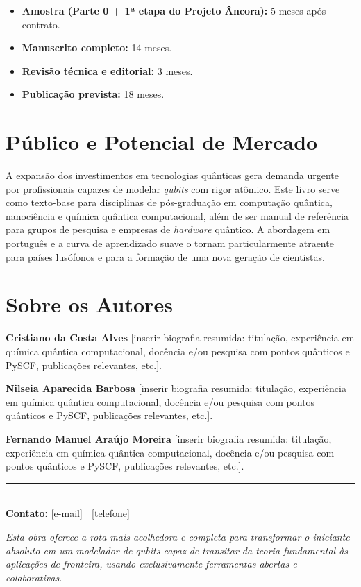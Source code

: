 \documentclass[12pt,a4paper]{article}
\begin{document}
	\begin{itemize}
		\item \textbf{Amostra (Parte 0 + 1ª etapa do Projeto Âncora):} 5 meses após contrato.
		\item \textbf{Manuscrito completo:} 14 meses.
		\item \textbf{Revisão técnica e editorial:} 3 meses.
		\item \textbf{Publicação prevista:} 18 meses.
	\end{itemize}
	
	\section{Público e Potencial de Mercado}
	
	A expansão dos investimentos em tecnologias quânticas gera demanda urgente por profissionais capazes de modelar \emph{qubits} com rigor atômico. Este livro serve como texto-base para disciplinas de pós-graduação em computação quântica, nanociência e química quântica computacional, além de ser manual de referência para grupos de pesquisa e empresas de \emph{hardware} quântico. A abordagem em português e a curva de aprendizado suave o tornam particularmente atraente para países lusófonos e para a formação de uma nova geração de cientistas.
	
	\section{Sobre os Autores}

	\textbf{Cristiano da Costa Alves} [inserir biografia resumida: titulação, experiência em química quântica computacional, docência e/ou pesquisa com pontos quânticos e PySCF, publicações relevantes, etc.].

	\textbf{Nilseia Aparecida Barbosa} [inserir biografia resumida: titulação, experiência em química quântica computacional, docência e/ou pesquisa com pontos quânticos e PySCF, publicações relevantes, etc.].

	\textbf{Fernando Manuel Araújo Moreira} [inserir biografia resumida: titulação, experiência em química quântica computacional, docência e/ou pesquisa com pontos quânticos e PySCF, publicações relevantes, etc.].
	\vspace{1cm}
	
	\begin{center}
		\rule{0.5\textwidth}{0.4pt}\\[0.3cm]
		\textbf{Contato:} [e-mail] $\mid$ [telefone]
	\end{center}
	
	\vspace{0.5cm}
	\noindent\textit{Esta obra oferece a rota mais acolhedora e completa para transformar o iniciante absoluto em um modelador de qubits capaz de transitar da teoria fundamental às aplicações de fronteira, usando exclusivamente ferramentas abertas e colaborativas.}
	
\end{document}
